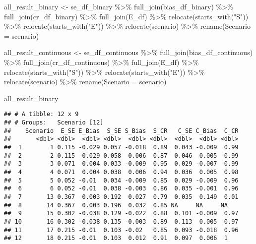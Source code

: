 \documentclass[
]{article}
\newenvironment{Shaded}{\begin{snugshade}}{\end{snugshade}}
\newcommand{\AttributeTok}[1]{\textcolor[rgb]{0.77,0.63,0.00}{#1}}
\newcommand{\FunctionTok}[1]{\textcolor[rgb]{0.00,0.00,0.00}{#1}}
\newcommand{\NormalTok}[1]{#1}
\newcommand{\OtherTok}[1]{\textcolor[rgb]{0.56,0.35,0.01}{#1}}
\newcommand{\SpecialCharTok}[1]{\textcolor[rgb]{0.00,0.00,0.00}{#1}}
\newcommand{\StringTok}[1]{\textcolor[rgb]{0.31,0.60,0.02}{#1}}
\begin{document}
\begin{Shaded}
\begin{Highlighting}[]
\NormalTok{all\_result\_binary }\OtherTok{\textless{}{-}}
\NormalTok{  se\_df\_binary }\SpecialCharTok{\%\textgreater{}\%} 
  \FunctionTok{full\_join}\NormalTok{(bias\_df\_binary) }\SpecialCharTok{\%\textgreater{}\%} 
  \FunctionTok{full\_join}\NormalTok{(cr\_df\_binary) }\SpecialCharTok{\%\textgreater{}\%} 
  \FunctionTok{full\_join}\NormalTok{(E\_df) }\SpecialCharTok{\%\textgreater{}\%}
  \FunctionTok{relocate}\NormalTok{(}\FunctionTok{starts\_with}\NormalTok{(}\StringTok{"S"}\NormalTok{)) }\SpecialCharTok{\%\textgreater{}\%} 
  \FunctionTok{relocate}\NormalTok{(}\FunctionTok{starts\_with}\NormalTok{(}\StringTok{"E"}\NormalTok{)) }\SpecialCharTok{\%\textgreater{}\%}
  \FunctionTok{relocate}\NormalTok{(scenario) }\SpecialCharTok{\%\textgreater{}\%}
  \FunctionTok{rename}\NormalTok{(}\AttributeTok{Scenario =}\NormalTok{ scenario)}
 
\NormalTok{all\_result\_continuous }\OtherTok{\textless{}{-}}
\NormalTok{  se\_df\_continuous }\SpecialCharTok{\%\textgreater{}\%} 
  \FunctionTok{full\_join}\NormalTok{(bias\_df\_continuous) }\SpecialCharTok{\%\textgreater{}\%} 
  \FunctionTok{full\_join}\NormalTok{(cr\_df\_continuous) }\SpecialCharTok{\%\textgreater{}\%} 
  \FunctionTok{full\_join}\NormalTok{(E\_df) }\SpecialCharTok{\%\textgreater{}\%}
  \FunctionTok{relocate}\NormalTok{(}\FunctionTok{starts\_with}\NormalTok{(}\StringTok{"S"}\NormalTok{)) }\SpecialCharTok{\%\textgreater{}\%} 
  \FunctionTok{relocate}\NormalTok{(}\FunctionTok{starts\_with}\NormalTok{(}\StringTok{"E"}\NormalTok{)) }\SpecialCharTok{\%\textgreater{}\%}
  \FunctionTok{relocate}\NormalTok{(scenario) }\SpecialCharTok{\%\textgreater{}\%}
  \FunctionTok{rename}\NormalTok{(}\AttributeTok{Scenario =}\NormalTok{ scenario)}

\NormalTok{all\_result\_binary }
\end{Highlighting}
\end{Shaded}

\begin{verbatim}
## # A tibble: 12 x 9
## # Groups:   Scenario [12]
##    Scenario  E_SE E_Bias  S_SE S_Bias  S_CR   C_SE C_Bias  C_CR
##       <dbl> <dbl>  <dbl> <dbl>  <dbl> <dbl>  <dbl>  <dbl> <dbl>
##  1        1 0.115 -0.029 0.057 -0.018  0.89  0.043 -0.009  0.99
##  2        2 0.115 -0.029 0.058  0.006  0.87  0.046  0.005  0.99
##  3        3 0.071  0.004 0.033 -0.009  0.95  0.029 -0.007  0.99
##  4        4 0.071  0.004 0.038  0.006  0.94  0.036  0.005  0.98
##  5        5 0.052 -0.01  0.034 -0.009  0.85  0.029 -0.009  0.96
##  6        6 0.052 -0.01  0.038 -0.003  0.86  0.035 -0.001  0.96
##  7       13 0.367  0.003 0.192  0.027  0.79  0.035  0.149  0.01
##  8       14 0.367  0.003 0.196  0.032  0.85 NA     NA     NA   
##  9       15 0.302 -0.038 0.129 -0.022  0.88  0.101 -0.009  0.97
## 10       16 0.302 -0.038 0.135 -0.003  0.89  0.113  0.005  0.97
## 11       17 0.215 -0.01  0.103 -0.02   0.85  0.093 -0.018  0.96
## 12       18 0.215 -0.01  0.103  0.012  0.91  0.097  0.006  1
\end{verbatim}
\end{document}
